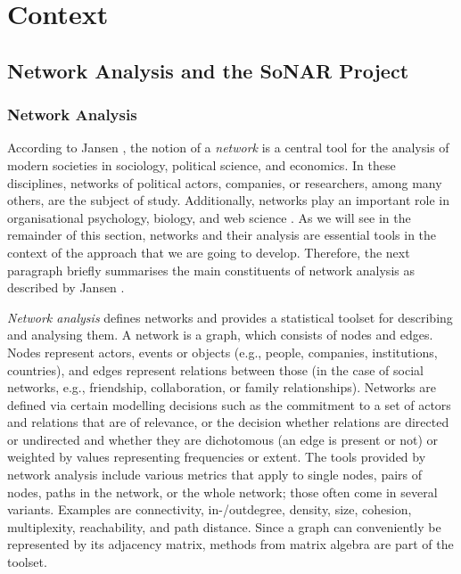 \chapter{Context}
\label{chap:rel_work}
\label{chap:context}
\section{Network Analysis and the SoNAR Project}
\label{sec:HNA+SoNAR}


\subsection{Network Analysis}

According to Jansen \autocite*{Jansen2003},
the notion of a \emph{network} is a central tool for the analysis
of modern societies in sociology, political science, and economics.
In these disciplines, networks of political actors, companies, or researchers,
among many others, are the subject of study.
Additionally, networks play an important role
in organisational psychology, biology, and web science \autocite{WikiSNAGerman,WikiNetworkAnalysis}.
As we will see in the remainder of this section,
networks and their analysis are essential tools
in the context of the approach that we are going to develop.
Therefore, the next paragraph briefly summarises the main constituents of network analysis
as described by Jansen \autocite*{Jansen2003}.

\emph{Network analysis}
defines networks and provides a statistical toolset for describing and analysing them.
A network is a graph, which consists of nodes and edges.
Nodes represent actors, events or objects (e.g., people, companies, institutions, countries),
and edges represent relations between those (in the case of social networks, e.g.,
friendship, collaboration, or family relationships).
Networks are defined via certain modelling decisions
such as the commitment to a set of actors and relations that are of relevance,
or the decision whether relations are directed or undirected
and whether they are dichotomous (an edge is present or not)
or weighted by values representing frequencies or extent.
The tools provided by network analysis include
various metrics that apply to single nodes, pairs of nodes, paths in the network,
or the whole network; those often come in several variants.
Examples are connectivity, in-/outdegree, density,
size, cohesion, multiplexity, reachability, and path distance.
Since a graph can conveniently be represented by its adjacency matrix,
methods from matrix algebra are part of the toolset.

